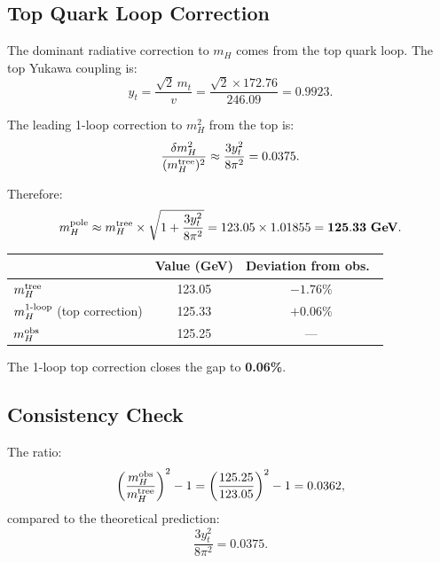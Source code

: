 \documentclass[11pt]{article}
\theoremstyle{definition}
\begin{document}
\subsection{Top Quark Loop Correction}

The dominant radiative correction to $m_H$ comes from the top quark loop.
The top Yukawa coupling is:
\begin{equation}
y_t = \frac{\sqrt{2}\,m_t}{v} = \frac{\sqrt{2} \times 172.76}{246.09}
= 0.9923.
\end{equation}

The leading 1-loop correction to $m_H^2$ from the top is:
\begin{equation}\label{eq:top-correction}
\frac{\delta m_H^2}{(m_H^{\rm tree})^2}
\approx \frac{3 y_t^2}{8\pi^2} = 0.0375.
\end{equation}

Therefore:
\begin{equation}
m_H^{\rm pole} \approx m_H^{\rm tree}
\times \sqrt{1 + \frac{3y_t^2}{8\pi^2}}
= 123.05 \times 1.01855 = \mathbf{125.33~\textbf{GeV}}.
\end{equation}

\begin{tcolorbox}[colback=blue!5!white, colframe=blue!50!black,
title=Radiative Correction Result]
\begin{center}
\renewcommand{\arraystretch}{1.4}
\begin{tabular}{lcc}
\toprule
& Value (GeV) & Deviation from obs.\ \\
\midrule
$m_H^{\rm tree}$ & 123.05 & $-1.76\%$ \\
$m_H^{\rm 1\text{-}loop}$ (top correction) & 125.33 & $+0.06\%$ \\
$m_H^{\rm obs}$ & 125.25 & --- \\
\bottomrule
\end{tabular}
\end{center}
The 1-loop top correction closes the gap to \textbf{0.06\%}.
\end{tcolorbox}

\subsection{Consistency Check}

The ratio:
\begin{equation}
\left(\frac{m_H^{\rm obs}}{m_H^{\rm tree}}\right)^2 - 1
= \left(\frac{125.25}{123.05}\right)^2 - 1 = 0.0362,
\end{equation}
compared to the theoretical prediction:
\begin{equation}
\frac{3 y_t^2}{8\pi^2} = 0.0375.
\end{equation}
\end{document}
